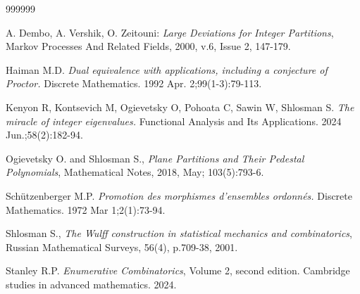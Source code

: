 \documentclass[12pt]{article}%
\begin{document}
\begin{thebibliography}{999999}                                                                                           %


A. Dembo, A. Vershik, O. Zeitouni: \textit{Large Deviations
for Integer Partitions}, Markov Processes And Related Fields, 2000, v.6, Issue
2, 147-179.

Haiman M.D. \textit{Dual equivalence with applications,
including a conjecture of Proctor.} Discrete Mathematics. 1992 Apr. 2;99(1-3):79-113.

Kenyon R, Kontsevich M, Ogievetsky O, Pohoata C, Sawin
W, Shlosman S. \textit{The miracle of integer eigenvalues.} Functional
Analysis and Its Applications. 2024 Jun.;58(2):182-94.

Ogievetsky O. and Shlosman S., \textit{Plane Partitions and
Their Pedestal Polynomials}, Mathematical Notes, 2018, May; 103(5):793-6.

Sch\"{u}tzenberger M.P. \textit{Promotion des morphismes
d'ensembles ordonn\'{e}s.} Discrete Mathematics. 1972 Mar 1;2(1):73-94.

Shlosman S., \textit{The Wulff construction in statistical
mechanics and combinatorics}, Russian Mathematical Surveys, 56(4), p.709-38, 2001.

Stanley R.P. \textit{Enumerative Combinatorics}, Volume 2,
second edition. Cambridge studies in advanced mathematics. 2024.
\end{thebibliography}
\end{document}
